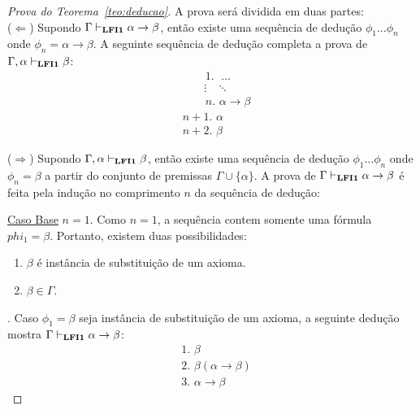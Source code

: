     \begin{proof}[Prova do Teorema~\ref{teo:deducao}] A prova será dividida em duas partes:\\
        ($\Longleftarrow$) Supondo $\Gamma \vdash_{\textbf{LFI1}{}} \alpha \to \beta$, então existe uma sequência de dedução $\phi_{1} \ldots \phi_{n}$ onde $\phi_{n} = \alpha \to \beta$. A seguinte sequência de dedução completa a prova de $\Gamma, \alpha \vdash_{\textbf{LFI1}{}} \beta$:
        \begin{align*}
            & \text{~~~~~~1. } \; \ldots\\
            & ~~~~~~\; \; \vdots \; \; \;\ddots\\
            & \text{~~~~~~$n$. } \alpha \to \beta\tag{Suposição}\\
            & \text{$n + 1$. } \alpha\tag{Premissa}\\
            & \text{$n + 2$. } \beta\tag{MP $n$, n + 1}
        \end{align*}

        \noindent  ($\Longrightarrow$) Supondo $\Gamma, \alpha \vdash_{\textbf{LFI1}{}} \beta$, então existe uma sequência de dedução $\phi_{1} \ldots \phi_{n}$ onde $\phi_{n} = \beta$ a partir do conjunto de premissas $\Gamma \cup \{\alpha\}$. A prova de $\Gamma \vdash_{\textbf{LFI1}{}} \alpha \to \beta$ é feita pela indução no comprimento $n$ da sequência de dedução:

        \noindent\underline{Caso Base} $n = 1$.
        Como $n = 1$, a sequência contem somente uma fórmula $phi_{1} = \beta$. Portanto, existem duas possibilidades:
        \begin{enumerate}
            \item $\beta$ é instância de substituição de um axioma.
            \item $\beta \in \Gamma$.
        \end{enumerate}

        . Caso $\phi_{1} = \beta$ seja instância de substituição de um axioma, a seguinte dedução mostra $\Gamma \vdash_{\textbf{LFI1}{}} \alpha \to \beta$:
        \begin{align*}
            & \text{1. } \beta \tag{Suposição}\\
            & \text{2. } \beta (\alpha \to \beta) \tag{Ax1}\\
            & \text{3. } \alpha \to \beta \tag{Ax2}
        \end{align*}
    \end{proof}
